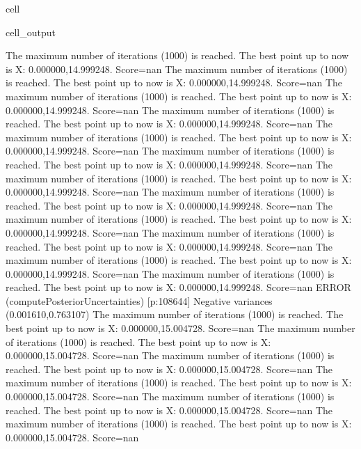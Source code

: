 \documentclass[letterpaper,10pt,english]{jupyterBook}
\begin{document}
\begin{sphinxuseclass}{cell}
\begin{sphinxVerbatimOutput}
\begin{sphinxuseclass}{cell_output}
\begin{sphinxVerbatim}[commandchars=\\\{\}]
The maximum number of iterations (1000) is reached. The best point up to now is X: \PYGZob{}0.000000,14.999248\PYGZcb{}. Score=\PYGZhy{}nan
The maximum number of iterations (1000) is reached. The best point up to now is X: \PYGZob{}0.000000,14.999248\PYGZcb{}. Score=\PYGZhy{}nan
The maximum number of iterations (1000) is reached. The best point up to now is X: \PYGZob{}0.000000,14.999248\PYGZcb{}. Score=\PYGZhy{}nan
The maximum number of iterations (1000) is reached. The best point up to now is X: \PYGZob{}0.000000,14.999248\PYGZcb{}. Score=\PYGZhy{}nan
The maximum number of iterations (1000) is reached. The best point up to now is X: \PYGZob{}0.000000,14.999248\PYGZcb{}. Score=\PYGZhy{}nan
The maximum number of iterations (1000) is reached. The best point up to now is X: \PYGZob{}0.000000,14.999248\PYGZcb{}. Score=\PYGZhy{}nan
The maximum number of iterations (1000) is reached. The best point up to now is X: \PYGZob{}0.000000,14.999248\PYGZcb{}. Score=\PYGZhy{}nan
The maximum number of iterations (1000) is reached. The best point up to now is X: \PYGZob{}0.000000,14.999248\PYGZcb{}. Score=\PYGZhy{}nan
The maximum number of iterations (1000) is reached. The best point up to now is X: \PYGZob{}0.000000,14.999248\PYGZcb{}. Score=\PYGZhy{}nan
The maximum number of iterations (1000) is reached. The best point up to now is X: \PYGZob{}0.000000,14.999248\PYGZcb{}. Score=\PYGZhy{}nan
The maximum number of iterations (1000) is reached. The best point up to now is X: \PYGZob{}0.000000,14.999248\PYGZcb{}. Score=\PYGZhy{}nan
The maximum number of iterations (1000) is reached. The best point up to now is X: \PYGZob{}0.000000,14.999248\PYGZcb{}. Score=\PYGZhy{}nan
ERROR (compute\PYGZus{}Posterior\PYGZus{}Uncertainties) [p:108644] Negative variances (\PYGZhy{}0.001610,0.763107)
The maximum number of iterations (1000) is reached. The best point up to now is X: \PYGZob{}0.000000,15.004728\PYGZcb{}. Score=\PYGZhy{}nan
The maximum number of iterations (1000) is reached. The best point up to now is X: \PYGZob{}0.000000,15.004728\PYGZcb{}. Score=\PYGZhy{}nan
The maximum number of iterations (1000) is reached. The best point up to now is X: \PYGZob{}0.000000,15.004728\PYGZcb{}. Score=\PYGZhy{}nan
The maximum number of iterations (1000) is reached. The best point up to now is X: \PYGZob{}0.000000,15.004728\PYGZcb{}. Score=\PYGZhy{}nan
The maximum number of iterations (1000) is reached. The best point up to now is X: \PYGZob{}0.000000,15.004728\PYGZcb{}. Score=\PYGZhy{}nan
The maximum number of iterations (1000) is reached. The best point up to now is X: \PYGZob{}0.000000,15.004728\PYGZcb{}. Score=\PYGZhy{}nan

\end{sphinxVerbatim}
\end{sphinxuseclass}
\end{sphinxVerbatimOutput}
\end{sphinxuseclass}
\end{document}

